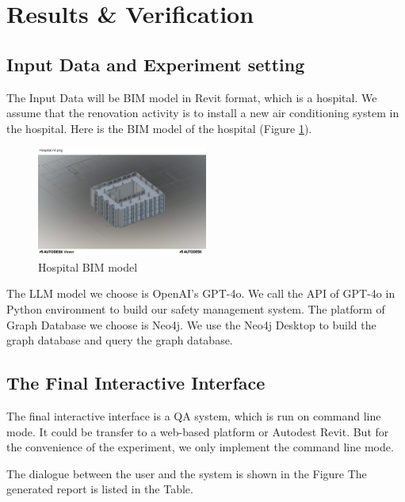\section{Results \& Verification}
\label{sec:results}
\subsection*{Input Data and Experiment setting}
The Input Data will be BIM model in Revit format, which is a hospital. We assume that the renovation activity is to install 
a new air conditioning system in the hospital. Here is the BIM model of the hospital (Figure \ref{fig:hospital}).
\begin{figure}
    \centering
    \includegraphics[width=0.5\textwidth]{figures/Hospital.rvt.png}
    \caption{Hospital BIM model}
    \label{fig:hospital}
\end{figure}

The LLM model we choose is OpenAI's GPT-4o. We call the API of GPT-4o in Python environment to build our safety management system.
The platform of Graph Database we choose is Neo4j. We use the Neo4j Desktop to build the graph database and query the graph database.

\subsection{The Final Interactive Interface}
The final interactive interface is a QA system, which is run on command line mode. It could be transfer to a web-based platform
or Autodest Revit. But for the convenience of the experiment, we only implement the command line mode.

The dialogue between the user and the system is shown in the Figure %
The generated report is listed in the Table.
        




